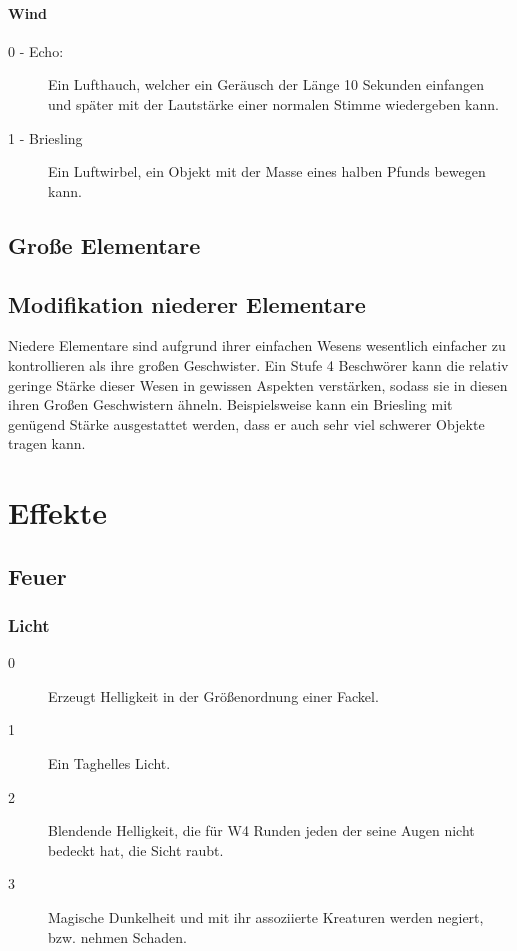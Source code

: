 \documentclass[a4paper,12pt,oneside]{book}
\begin{document}
\subsection{Wind}
\begin{description}
\item[0 - Echo:]Ein Lufthauch, welcher ein Geräusch der Länge 10 Sekunden einfangen und später mit der Lautstärke einer normalen Stimme wiedergeben kann.
\item[1 - Briesling]Ein Luftwirbel, ein Objekt mit der Masse eines halben Pfunds bewegen kann.
\end{description}

\chapter{Große Elementare}

\chapter{Modifikation niederer Elementare}
Niedere Elementare sind aufgrund ihrer einfachen Wesens wesentlich einfacher zu kontrollieren als ihre großen Geschwister. Ein Stufe 4 Beschwörer kann die relativ geringe Stärke dieser Wesen in gewissen Aspekten verstärken, sodass sie in diesen ihren Großen Geschwistern ähneln. Beispielsweise kann ein Briesling mit genügend Stärke ausgestattet werden, dass er auch sehr viel schwerer Objekte tragen kann.

\part{Effekte}

\chapter{Feuer}
\section{Licht}
\begin{description}
\item[0] Erzeugt Helligkeit in der Größenordnung einer Fackel.
\item[1] Ein Taghelles Licht.
\item[2] Blendende Helligkeit, die für W4 Runden jeden der seine Augen nicht bedeckt hat, die Sicht raubt.
\item[3] Magische Dunkelheit und mit ihr assoziierte Kreaturen werden negiert, bzw. nehmen Schaden.     
\end{description}
\end{document}
